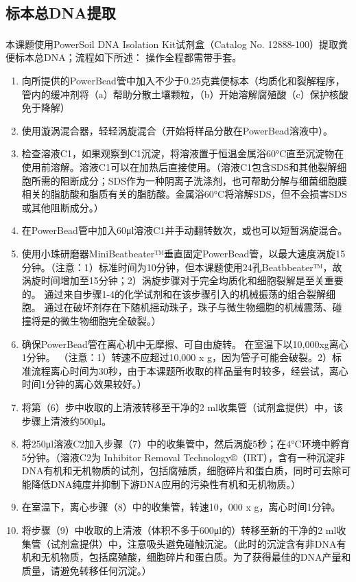   \subsection{标本总DNA提取}
  \label{标本总DNA提取}
  本课题使用PowerSoil\textsuperscript{\textregistered} DNA Isolation Kit试剂盒（Catalog No. 12888-100）提取粪便标本总DNA；流程如下所述：
  操作全程都需带手套。
    \begin{enumerate}
      \item 向所提供的PowerBead管中加入不少于0.25克粪便标本（均质化和裂解程序，管内的缓冲剂将（a）帮助分散土壤颗粒，（b）开始溶解腐殖酸（c）保护核酸免于降解）
      \item 使用漩涡混合器，轻轻涡旋混合（开始将样品分散在PowerBead溶液中）。
      \item 检查溶液C1，如果观察到C1沉淀，将溶液置于恒温金属浴60°C直至沉淀物在使用前溶解。溶液C1可以在加热后直接使用。（溶液C1包含SDS和其他裂解细胞所需的阻断成分；SDS作为一种阴离子洗涤剂，也可帮助分解与细菌细胞膜相关的脂肪酸和脂质有关的脂肪酸。金属浴60°C将溶解SDS，但不会损害SDS或其他阻断成分。）
      \item 在PowerBead管中加入60μl溶液C1并手动翻转数次，或也可以短暂涡旋混合。
      \item 使用小珠研磨器MiniBeatbeater™垂直固定PowerBead管，以最大速度涡旋15分钟。（注意：1）标准时间为10分钟，但本课题使用24孔Beatbbeater™，故涡旋时间增加至15分钟；2）涡旋步骤对于完全均质化和细胞裂解是至关重要的。 通过来自步骤1-4的化学试剂和在该步骤引入的机械振荡的组合裂解细胞。 通过在破坏剂存在下随机摇动珠子，珠子与微生物细胞的机械震荡、碰撞将是的微生物细胞完全破裂。）
      \item 确保PowerBead管在离心机中无摩擦、可自由旋转。 在室温下以10,000xg离心1分钟。 （注意：1）转速不应超过10,000 x g，因为管子可能会破裂。2）标准流程离心时间为30秒，由于本课题所收取的样品量有时较多，经尝试，离心时间1分钟的离心效果较好。）
      \item 将第（6）步中收取的上清液转移至干净的2 ml收集管（试剂盒提供）中，该步骤上清液约500μl。
      \item 将250μl溶液C2加入步骤（7）中的收集管中，然后涡旋5秒；在4°C环境中孵育5分钟。（溶液C2为 Inhibitor Removal Technology®（IRT），含有一种沉淀非DNA有机和无机物质的试剂，包括腐殖质，细胞碎片和蛋白质，同时可去除可能降低DNA纯度并抑制下游DNA应用的污染性有机和无机物质。）
      \item 在室温下，离心步骤（8）中的收集管，转速10，000 x g，离心时间1分钟。
      \item 将步骤（9）中收取的上清液（体积不多于600μl的）转移至新的干净的2 ml收集管（试剂盒提供）中，注意吸头避免碰触沉淀。（此时的沉淀含有非DNA有机和无机物质，包括腐殖酸，细胞碎片和蛋白质。为了获得最佳的DNA产量和质量，请避免转移任何沉淀。）

\end{enumerate}
